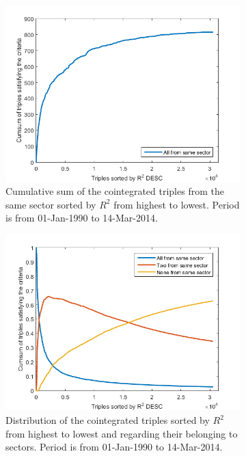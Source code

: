 \documentclass[11pt,a4,twosided,singlespacing,titlepagenumber=on]{scrreprt}
\numberwithin{equation}{chapter} %
\theoremstyle{remark}
\begin{document}
\begin{figure}[H]
    \centering
    \begin{subfigure}[t]{0.49\textwidth}
        \centering
        \includegraphics[width=1\textwidth]{triples_sector_0}
        \caption{Cumulative sum of the cointegrated triples from the same sector sorted by $R^2$ from highest to lowest. Period is from 01-Jan-1990 to 14-Mar-2014.}
        \label{triples_sector_0}
    \end{subfigure}
    \begin{subfigure}[t]{0.49\textwidth}
        \centering
        \includegraphics[width=1\textwidth]{triples_sector_1}
        \caption{Distribution of the cointegrated triples sorted by $R^2$ from highest to lowest and regarding their belonging to sectors. Period is from 01-Jan-1990 to 14-Mar-2014.}
        \label{triples_sector_1}
    \end{subfigure}
    \caption{}
\end{figure}
\end{document}
